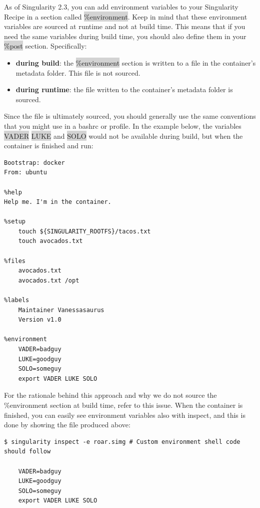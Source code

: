 \documentclass[a4paper]{article}
\begin{document}
	As of Singularity 2.3, you can add environment variables to your Singularity Recipe in a section called \colorbox{lightgray}{\%environment}. Keep in mind that these environment variables are sourced at runtime and not at build time. This means that if you need the same variables during build time, you should also define them in your \colorbox{lightgray}{\%post} section. Specifically:\\[0.1in]

 \begin{itemize}
 \item \textbf{during build}: the \colorbox{lightgray}{\%environment} section is written to a file in the container’s metadata folder. This file is not sourced.
 \item \textbf{during runtime}: the file written to the container’s metadata folder is sourced.
 \end{itemize}
Since the file is ultimately sourced, you should generally use the same conventions that you might use in a bashrc or profile. In the example below, the variables \colorbox{lightgray}{VADER} \colorbox{lightgray}{LUKE} and \colorbox{lightgray}{SOLO} would not be available during build, but when the container is finished and run:

\begin{lstlisting}[frame=single]  
Bootstrap: docker
From: ubuntu

%help
Help me. I'm in the container.

%setup
    touch ${SINGULARITY_ROOTFS}/tacos.txt
    touch avocados.txt

%files
    avocados.txt
    avocados.txt /opt    

%labels
    Maintainer Vanessasaurus
    Version v1.0

%environment
    VADER=badguy
    LUKE=goodguy
    SOLO=someguy
    export VADER LUKE SOLO
\end{lstlisting}

For the rationale behind this approach and why we do not source the \%environment section at build time, refer to this issue. When the container is finished, you can easily see environment variables also with inspect, and this is done by showing the file produced above:

\begin{lstlisting}[frame=single]  
$ singularity inspect -e roar.simg # Custom environment shell code should follow

    VADER=badguy
    LUKE=goodguy
    SOLO=someguy
    export VADER LUKE SOLO
\end{lstlisting}
    
\end{document}
